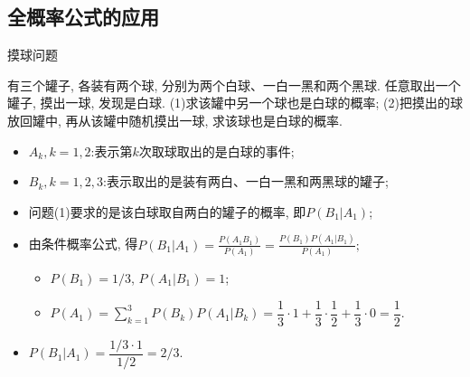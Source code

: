 \subsection{全概率公式的应用}
\begin{frame}{摸球问题}
	\begin{exam}
		有三个罐子, 各装有两个球, 分别为两个白球、一白一黑和两个黑球. 任意取出一个罐子, 摸出一球, 发现是白球. (1)求该罐中另一个球也是白球的概率; (2)把摸出的球放回罐中, 再从该罐中随机摸出一球, 求该球也是白球的概率.
	\end{exam}

	\begin{jieda}
		\begin{itemize}[<+-|alert@+>]
			\item $A_k, k=1,2$:表示第$k$次取球取出的是白球的事件;
			\item $B_k, k=1,2,3$:表示取出的是装有两白、一白一黑和两黑球的罐子;
			\item 问题(1)要求的是该白球取自两白的罐子的概率, 即$P(B_1|A_1)$;
			\item 由条件概率公式, 得$P(B_1|A_1)=\frac{P(A_1B_1)}{P(A_1)}=\frac{P(B_1)P(A_1|B_1)}{P(A_1)};$%
			\begin{itemize}[<+-|alert@+>]
				\item $P(B_1)=1/3$, \pause $P(A_1|B_1)=1$;\pause
				\item $P(A_1)=\sum\limits_{k=1}^{3}P(B_k)P(A_1|B_k)=\dfrac{1}{3}\cdot 1+\dfrac{1}{3}\cdot\dfrac{1}{2}+\dfrac{1}{3}\cdot 0=\dfrac{1}{2}.$
			\end{itemize}
			\item $P(B_1|A_1)=\dfrac{1/3\cdot 1}{1/2}=2/3$.
		\end{itemize}

	\end{jieda}
\end{frame}

